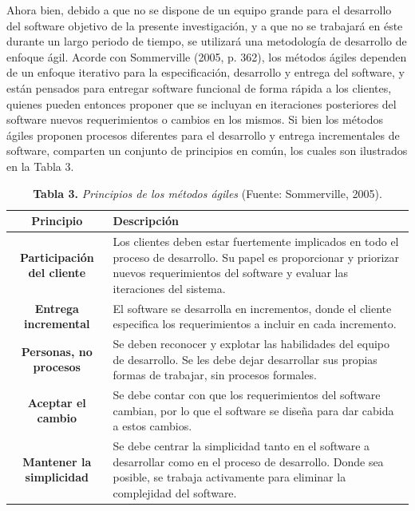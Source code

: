 \documentclass[12pt, a4paper]{article}
\begin{document}
Ahora bien, debido a que no se dispone de un equipo grande para el desarrollo del software objetivo de la presente investigaci\'{o}n, y a que no se trabajar\'{a} en \'{e}ste durante un largo periodo de tiempo, se utilizar\'{a} una metodolog\'{i}a de desarrollo de enfoque \'{a}gil. Acorde con Sommerville (2005, p. 362), los m\'{e}todos \'{a}giles dependen de un enfoque iterativo para la especificaci\'{o}n, desarrollo y entrega del software, y est\'{a}n pensados para entregar software funcional de forma r\'{a}pida a los clientes, quienes pueden entonces proponer que se incluyan en iteraciones posteriores del software nuevos requerimientos o cambios en los mismos. Si bien los m\'{e}todos \'{a}giles proponen procesos diferentes para el desarrollo y entrega incrementales de software, comparten un conjunto de principios en com\'{u}n, los cuales son ilustrados en la Tabla 3.

\begin{table}[htb]
	\small
	\centering
	\setlength{\extrarowheight}{5pt}
	\begin{tabulary}{15cm}{|c|L|}
		\hline
		\textbf{Principio} & \textbf{Descripci\'{o}n}\\ \hline
		\textbf{Participaci\'{o}n del cliente} & Los clientes deben estar fuertemente implicados en todo el proceso de desarrollo. Su papel es proporcionar y priorizar nuevos requerimientos del software y evaluar las iteraciones del sistema.\\ \hline
		\textbf{Entrega incremental} & El software se desarrolla en incrementos, donde el cliente especifica los requerimientos a incluir en cada incremento.\\ \hline
		\textbf{Personas, no procesos} & Se deben reconocer y explotar las habilidades del equipo de desarrollo. Se les debe dejar desarrollar sus propias formas de trabajar, sin procesos formales.\\ \hline
		\textbf{Aceptar el cambio} & Se debe contar con que los requerimientos del software cambian, por lo que el software se dise\~{n}a para dar cabida a estos cambios.\\ \hline
		\textbf{Mantener la simplicidad} & Se debe centrar la simplicidad tanto en el software a desarrollar como en el proceso de desarrollo. Donde sea posible, se trabaja activamente para eliminar la complejidad del software.\\ \hline
	\end{tabulary}
	\caption{\textbf{Tabla 3.} \textit{Principios de los m\'{e}todos \'{a}giles} (Fuente: Sommerville, 2005).}
\end{table}
\end{document}
